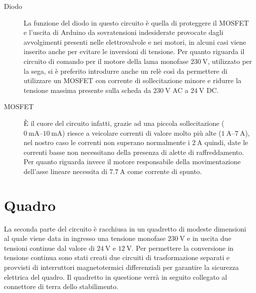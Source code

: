 \documentclass{report}
\begin{document}
\begin{description}
\item[Diodo] La funzione del diodo in questo circuito è quella di proteggere il MOSFET e l'uscita di Arduino da sovratensioni indesiderate provocate dagli avvolgimenti presenti nelle elettrovalvole e nei motori, in alcuni casi viene inserito anche per evitare le inversioni di tensione. Per quanto riguarda il circuito di comando per il motore della lama monofase $\SI{230}{\volt}$, utilizzato per la sega, si è preferito introdurre anche un relè così da permettere di utilizzare un MOSFET con corrente di sollecitazione minore e ridurre la tensione massima presente sulla scheda da $\SI{230}{\volt}$ AC a $\SI{24}{\volt}$ DC.
\item[MOSFET] È il cuore del circuito infatti, grazie ad una piccola sollecitazione ($\SIrange{0}{10}{\milli\ampere}$) riesce a veicolare correnti di valore molto più alte ($\SIrange{1}{7}{\ampere}$), nel nostro caso le correnti non superano normalmente i $\SI{2}{\ampere}$ quindi, date le correnti basse non necessitano della presenza di alette di raffreddamento. Per quanto riguarda invece il motore responsabile della movimentazione dell'asse lineare necessita di $\SI{7,7}{\ampere}$ come corrente di spunto.
\end{description}
\section{Quadro}
La seconda parte del circuito è racchiusa in un quadretto di modeste dimensioni al quale viene data in ingresso una tensione monofase $\SI{230}{\volt}$ e in uscita due tensioni continue dal valore di $\SI{24}{\volt}$ e $\SI{12}{\volt}$.
Per permettere la conversione in tensione continua sono stati creati due circuiti di trasformazione separati e provvisti di interruttori magnetotermici differenziali per garantire la sicurezza elettrica del quadro.
Il quadretto in questione verrà in seguito collegato al connettore di terra dello stabilimento.
\end{document}
